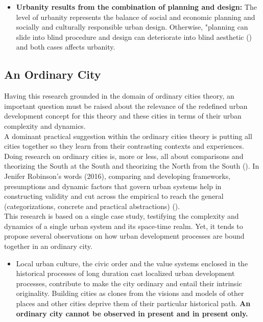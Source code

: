 \documentclass[11pt]{report}
\begin{document}
{\begin{itemize}
\item \textbf{Urbanity results from the combination of planning and design:}
The level of urbanity represents the balance of social and economic planning and socially and culturally responsible urban design.
Otherwise, "planning can slide into blind procedure and design can deteriorate into blind aesthetic
(\href{Van}{\citealt{van_assche_co-evolutions_2013}}) and both cases affects urbanity.
\end{itemize}

\subsection{An Ordinary City}

Having this research grounded in the domain of ordinary cities theory, an important question must be raised about the relevance of the redefined urban development concept for this theory and these cities in terms of their urban complexity and dynamics.
\\

A dominant practical suggestion within the ordinary cities theory is putting all cities together so they learn from their contrasting contexts and experiences. Doing research on ordinary cities is, more or less, all about comparisons and theorizing the South at the South   and theorizing the North from the South (\href{Chaplin}{\citealt{chaplin_architecture_2015}}).
In Jenifer Robinson's words (2016), comparing and developing frameworks, presumptions and dynamic factors that govern urban systems help in constructing validity and cut across the empirical to reach the general (categorizations, concrete and practical abstractions) (\href{Robinson}{\citealt{robinson_thinking_2016}}).
\\

This research is based on a single case study, testifying the complexity and dynamics of a single urban system and its space-time realm.
Yet, it tends to propose several observations on how urban development processes are bound together in an ordinary city.

\begin{itemize}
\item
Local urban culture, the civic order and the value systems enclosed in the historical processes of long duration cast localized urban development processes, contribute to make the city ordinary and entail their intrinsic originality.
Building cities as clones from the visions and models of other places and other cities
deprive them of their particular historical path.
\textbf{An ordinary city cannot be observed in present and in present only.}


\end{itemize}}
\end{document}
